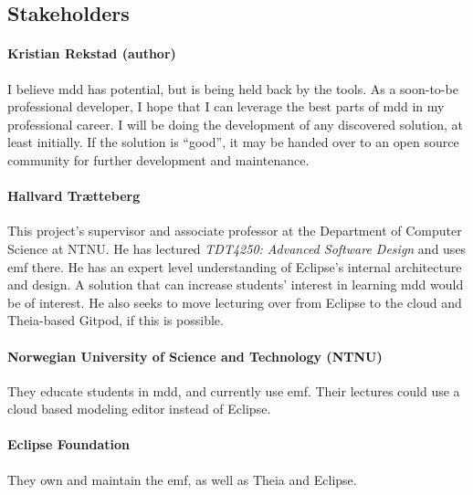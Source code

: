 \subsection{Stakeholders}

\paragraph*{Kristian Rekstad (author)} I believe \acrfull{mdd} has potential, but is being held back by the tools. As a soon-to-be professional developer, I hope that I can leverage the best parts of \acrshort{mdd} in my professional career.
I will be doing the development of any discovered solution, at least initially.
If the solution is ``good'', it may be handed over to an \gls{open source} community for further development and maintenance.

\paragraph*{Hallvard Trætteberg} This project's supervisor and associate professor at the Department of Computer Science at \acrshort{NTNU}. 
He has lectured \textit{TDT4250: Advanced Software Design} and uses \acrshort{emf} there.
He has an expert level understanding of \gls{Eclipse}'s internal architecture and design.
A solution that can increase students' interest in learning \acrshort{mdd} would be of interest. 
He also seeks to move lecturing over from \gls{Eclipse} to the \gls{cloud} and \gls{Theia}-based \gls{Gitpod}, if this is possible.

\paragraph*{Norwegian University of Science and Technology (\acrshort{NTNU})} They educate students in \acrlong{mdd}, and currently use \acrshort{emf}. Their lectures could use a cloud based modeling editor instead of \gls{Eclipse}.

\paragraph*{Eclipse Foundation} They own and maintain the \acrlong{emf}, as well as \gls{Theia} and \gls{Eclipse}.

